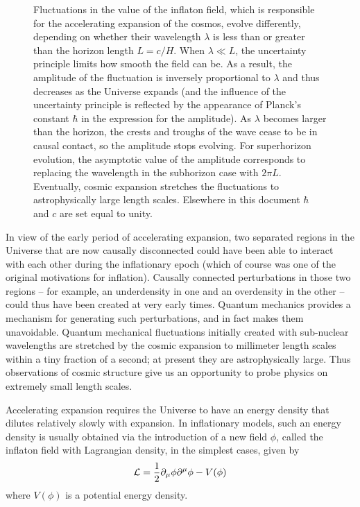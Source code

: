 \begin{figure}[ht]
{Fluctuations in the value of the inflaton field, which is responsible for the accelerating expansion of the cosmos, evolve differently, depending on whether their wavelength $\lambda$ is less than or greater than the horizon length $L = c/H$. When $\lambda \ll L$, the uncertainty principle limits how smooth the field can be. As a result, the amplitude of the fluctuation is inversely proportional to $\lambda$ and thus decreases as the Universe expands (and the influence of the uncertainty principle is reflected by the appearance of Planck's constant $\hbar$ in the expression for the amplitude). As $\lambda$ becomes larger than the horizon, the crests and troughs of the wave cease to be in causal contact, so the amplitude stops evolving. For superhorizon evolution, the asymptotic value of the amplitude corresponds to replacing the wavelength in the subhorizon case with $2\pi L$. Eventually, cosmic expansion stretches the fluctuations to astrophysically large length scales. Elsewhere in this document $\hbar$ and $c$ are set equal to unity.
}
\label{fig:PTfigs}
\end{figure}


In view of the early period of accelerating expansion, two separated regions in the Universe that are now causally disconnected could have been able to interact with each other during the inflationary epoch (which of course was one of the original motivations for inflation). Causally connected perturbations in those two regions -- for example, an underdensity in one and an overdensity in the other -- could thus have been created at very early times. Quantum mechanics provides a mechanism for generating such perturbations, and in fact makes them unavoidable. Quantum mechanical fluctuations initially created with sub-nuclear wavelengths are stretched by the cosmic expansion to millimeter length scales within a tiny fraction of a second; at present they are astrophysically large. Thus observations of cosmic structure give us an opportunity to probe physics on extremely small length scales.

Accelerating expansion requires the Universe to have an energy density that dilutes relatively slowly with expansion. In inflationary models, such an energy density is usually obtained via the introduction of a new field $\phi$, called the inflaton field with Lagrangian density, in the simplest cases, given by
\begin{equation}
{\cal L} = \frac{1}{2} \partial_\mu \phi \partial^\mu \phi - V(\phi)
\end{equation}
where $V(\phi)$ is a potential energy density. 

